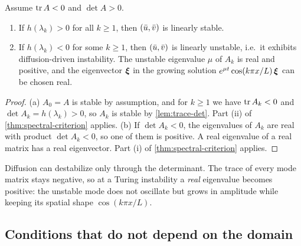 \begin{theorem}\label{thm:ddi-criterion}
Assume $\operatorname{tr} A<0$ and $\det A>0$.
\begin{enumerate}[label=(\alph*)]
  \item If $h(\lambda_k)>0$ for all $k\ge1$, then $(\bar u,\bar v)$ is linearly stable.
  \item If $h(\lambda_k)<0$ for some $k\ge1$, then $(\bar u,\bar v)$ is linearly unstable,
        i.e.\ it exhibits diffusion-driven instability. The unstable eigenvalue
        $\mu$ of $A_k$ is real and positive, and the eigenvector $\boldsymbol{\xi}$ in the
        growing solution $e^{\mu t}\cos(k\pi x/L)\,\boldsymbol{\xi}$ can be chosen real.
\end{enumerate}
\end{theorem}

\begin{proof}
(a) $A_0=A$ is stable by assumption, and for $k\ge1$ we have $\operatorname{tr} A_k<0$ and
$\det A_k=h(\lambda_k)>0$, so $A_k$ is stable by \cref{lem:trace-det}. Part (ii) of
\cref{thm:spectral-criterion} applies. (b) If $\det A_k<0$, the eigenvalues of $A_k$
are real with product $\det A_k<0$, so one of them is positive. A real eigenvalue of
a real matrix has a real eigenvector. Part (i) of \cref{thm:spectral-criterion}
applies.
\end{proof}

\begin{keyidea}
Diffusion can destabilize only through the determinant. The trace of every mode
matrix stays negative, so at a Turing instability a \emph{real} eigenvalue becomes
positive: the unstable mode does not oscillate but grows in amplitude while keeping
its spatial shape $\cos(k\pi x/L)$.
\end{keyidea}

\subsection{Conditions that do not depend on the domain}

